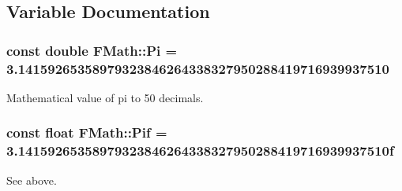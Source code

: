 \subsection{Variable Documentation}
\hypertarget{namespaceFMath_a4c8e25df39e90e06ce866c1b509b9bec}{
\subsubsection[{Pi}]{\setlength{\rightskip}{0pt plus 5cm}const double {\bf FMath::Pi} = 3.14159265358979323846264338327950288419716939937510}}
\label{namespaceFMath_a4c8e25df39e90e06ce866c1b509b9bec}
Mathematical value of pi to 50 decimals. \hypertarget{namespaceFMath_aafd87a7033f63650d2fa9a7ce9f256ea}{
\subsubsection[{Pif}]{\setlength{\rightskip}{0pt plus 5cm}const float {\bf FMath::Pif} = 3.14159265358979323846264338327950288419716939937510f}}
\label{namespaceFMath_aafd87a7033f63650d2fa9a7ce9f256ea}
See above. 